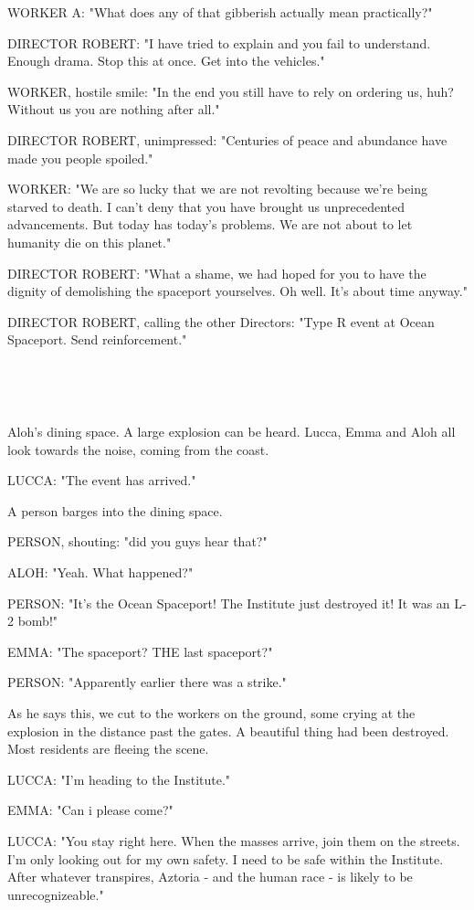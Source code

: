 \documentclass[11pt]{article}
\begin{document}
WORKER A: "What does any of that gibberish actually mean practically?"

DIRECTOR ROBERT: "I have tried to explain and you fail to understand.
Enough drama.
Stop this at once. 
Get into the vehicles."

WORKER, hostile smile: "In the end you still have to rely on ordering us, huh? 
Without us you are nothing after all."

DIRECTOR ROBERT, unimpressed: "Centuries of peace and abundance have made you people spoiled."

WORKER: "We are so lucky that we are not revolting because we're being starved to death.
I can't deny that you have brought us unprecedented advancements.
But today has today's problems.
We are not about to let humanity die on this planet."

DIRECTOR ROBERT: "What a shame, we had hoped for you to have the dignity of demolishing the spaceport yourselves. Oh well. 
It's about time anyway."

DIRECTOR ROBERT, calling the other Directors: "Type R event at Ocean Spaceport.
Send reinforcement."

\ 

\ 

Aloh's dining space.
A large explosion can be heard. 
Lucca, Emma and Aloh all look towards the noise, coming from the coast.

LUCCA: "The event has arrived."

A person barges into the dining space.

PERSON, shouting: "did you guys hear that?"

ALOH: "Yeah. What happened?"

PERSON: "It's the Ocean Spaceport! 
The Institute just destroyed it! 
It was an L-2 bomb!"

EMMA: "The spaceport? THE last spaceport?"

PERSON: "Apparently earlier there was a strike."

As he says this, we cut to the workers on the ground, some crying at the explosion in the distance past the gates.
A beautiful thing had been destroyed.
Most residents are fleeing the scene. 

LUCCA: "I'm heading to the Institute."

EMMA: "Can i please come?"

LUCCA: "You stay right here. When the masses arrive, join them on the streets. 
I'm only looking out for my own safety. I need to be safe within the Institute.
After whatever transpires, Aztoria - and the human race - is likely to be unrecognizeable."
\end{document}
